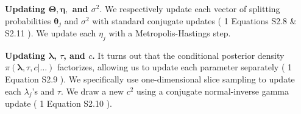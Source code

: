 \documentclass[11pt]{article}
\newcommand{\calE}{\mathcal{E}}
\newcommand{\calL}{\mathcal{L}}
\newcommand{\calM}{\mathcal{M}}
\newcommand{\calT}{\mathcal{T}}
\newcommand{\calI}{\mathcal{I}}
\newcommand{\bx}{\bm{x}}
\newcommand{\bz}{\bm{z}}
\newcommand{\br}{\bm{r}}
\newcommand{\btheta}{\boldsymbol{\theta}}
\newcommand{\blambda}{\boldsymbol{\lambda}}
\newcommand{\bTheta}{\boldsymbol{\Theta}}
\newcommand{\bEta}{\boldsymbol{\eta}}
\theoremstyle{plain}
\theoremstyle{definition}
\theoremstyle{plain}
\newcommand{\includesupp}{1}
\newcommand{\switchref}[2]{%
  \if\includesupp1%
    #1%
  \else%
    #2%
  \fi%
}
\begin{document}

\textbf{Updating $\bTheta, \bEta,$ and $\sigma^{2}$}. We respectively update each vector of splitting probabilities $\btheta_{j}$ and $\sigma^{2}$ with standard conjugate updates (\switchref{}{Equations S2.8 \&  S2.11}). We update each $\eta_{j}$ with a Metropolis-Hastings step.

\textbf{Updating $\blambda$, $\tau$, and $c$.} 
It turns out that the conditional posterior density $\pi(\blambda, \tau, c \vert \ldots)$ factorizes, allowing us to update each parameter separately (\switchref{}{Equation S2.9}).
We specifically use one-dimensional slice sampling to update each $\lambda_{j}$'s and $\tau.$ 
We draw a new $c^{2}$ using a conjugate normal-inverse gamma update (\switchref{}{Equation S2.10}). 
\end{document}
